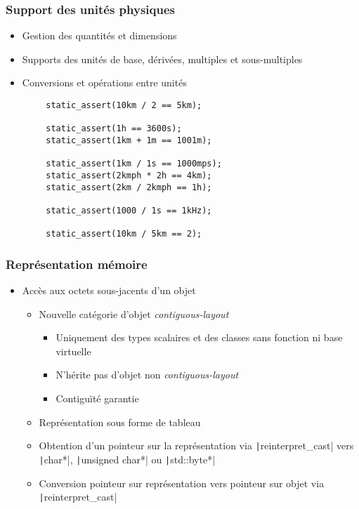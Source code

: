 \documentclass[C++.tex]{subfiles}
\begin{document}
\begin{frame}[fragile]
	\frametitle{Support des unités physiques}
	\begin{itemize}
		\item Gestion des quantités et dimensions
		\item Supports des unités de base, dérivées, multiples et sous-multiples
		\item Conversions et opérations entre unités
	\end{itemize}

	\begin{verbatim}
		static_assert(10km / 2 == 5km);

		static_assert(1h == 3600s);
		static_assert(1km + 1m == 1001m);

		static_assert(1km / 1s == 1000mps);
		static_assert(2kmph * 2h == 4km);
		static_assert(2km / 2kmph == 1h);

		static_assert(1000 / 1s == 1kHz);

		static_assert(10km / 5km == 2);
	\end{verbatim}

\end{frame}

\begin{frame}[fragile]
	\frametitle{Représentation mémoire}
	\begin{itemize}
		\item Accès aux octets sous-jacents d'un objet
		\begin{itemize}
			\item Nouvelle catégorie d'objet \textit{contiguous-layout}
			\begin{itemize}
				\item Uniquement des types scalaires et des classes sans fonction ni base virtuelle
				\item N'hérite pas d'objet non \textit{contiguous-layout}
				\item Contiguïté garantie
			\end{itemize}
			\item Représentation sous forme de tableau
			\item Obtention d'un pointeur sur la représentation via \texttt|reinterpret_cast| vers \texttt|char*|, \texttt|unsigned char*| ou \texttt|std::byte*|
			\item Conversion pointeur sur représentation vers pointeur sur objet via \texttt|reinterpret_cast|
		\end{itemize}
	\end{itemize}
\end{frame}
\end{document}
